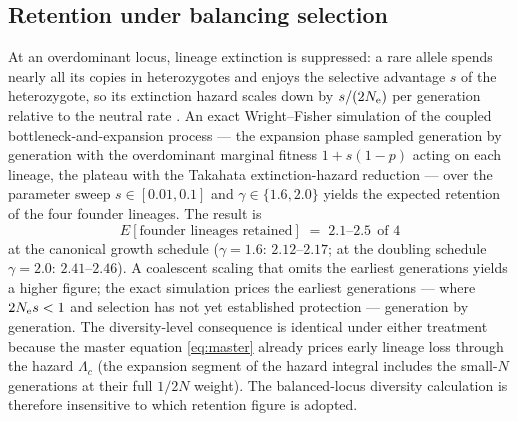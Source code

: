 \subsection{Retention under balancing selection}\label{sec:ret}
At an overdominant locus, lineage extinction is suppressed: a rare allele
spends nearly all its copies in heterozygotes and enjoys the selective
advantage $s$ of the heterozygote, so its extinction hazard scales down by
$s/(2N_{\mathrm{e}})$ per generation relative to the neutral rate
\citep{Takahata1990}. An exact
Wright--Fisher simulation of the coupled bottleneck-and-expansion process
--- the expansion phase
sampled generation by generation with the overdominant marginal fitness
$1 + s(1-p)$ acting on each lineage, the plateau with the Takahata
extinction-hazard reduction --- over the parameter sweep
$s \in [0.01, 0.1]$ and $\gamma \in \{1.6, 2.0\}$ yields the expected
retention of the four founder lineages. The result is
\begin{equation}\label{eq:hlaret}
E[\text{founder lineages retained}] \;=\; 2.1\text{--}2.5 \ \ \text{of } 4
\end{equation}
at the canonical growth schedule ($\gamma = 1.6$: $2.12$--$2.17$; at the
doubling schedule $\gamma = 2.0$: $2.41$--$2.46$). A coalescent scaling
that omits the earliest generations yields a higher figure; the exact
simulation prices the earliest generations --- where $2N_{\mathrm{e}} s < 1$ and
selection has not yet established protection --- generation by
generation. The diversity-level consequence is
identical under either treatment because the master equation
\eqref{eq:master} already prices early lineage loss through the hazard
$\Lambda_c$ (the expansion segment of the hazard integral includes the
small-$N$ generations at their full $1/2N$ weight). The balanced-locus
diversity calculation is therefore insensitive to which retention figure
is adopted.

